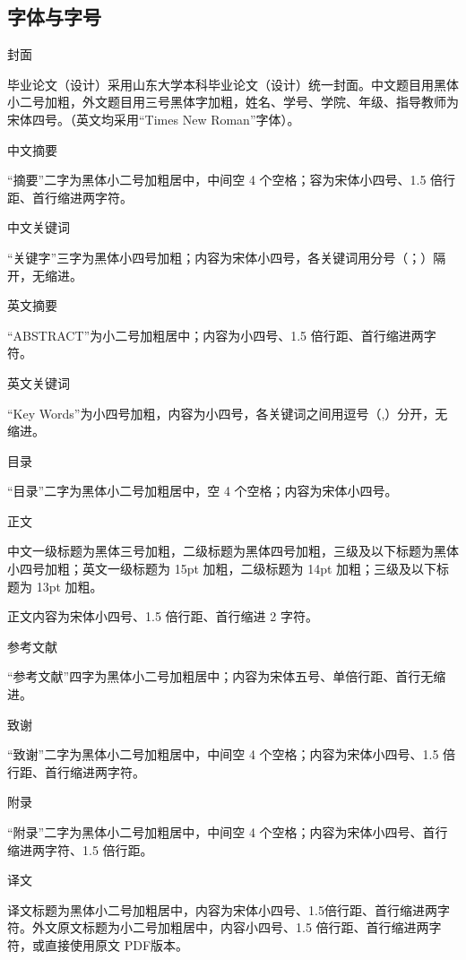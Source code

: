 \subsection{字体与字号}
\begin{compactenum}
\item 封面

毕业论文（设计）采用山东大学本科毕业论文（设计）统一封面。中文题目用黑体小二号加粗，外文题目用三号黑体字加粗，姓名、学号、学院、年级、指导教师为宋体四号。（英文均采用“Times New Roman”字体）。
\item 中文摘要

“摘要”二字为黑体小二号加粗居中，中间空 4 个空格；容为宋体小四号、1.5 倍行距、首行缩进两字符。
\item 中文关键词

“关键字”三字为黑体小四号加粗；内容为宋体小四号，各关键词用分号（；）隔开，无缩进。
\item 英文摘要

“ABSTRACT”为小二号加粗居中；内容为小四号、1.5 倍行距、首行缩进两字符。
\item 英文关键词

“Key Words”为小四号加粗，内容为小四号，各关键词之间用逗号（,）分开，无缩进。
\item 目录

“目录”二字为黑体小二号加粗居中，空 4 个空格；内容为宋体小四号。
\item 正文

中文一级标题为黑体三号加粗，二级标题为黑体四号加粗，三级及以下标题为黑体小四号加粗；英文一级标题为 15pt 加粗，二级标题为 14pt 加粗；三级及以下标题为 13pt 加粗。

正文内容为宋体小四号、1.5 倍行距、首行缩进 2 字符。
\item 参考文献

“参考文献”四字为黑体小二号加粗居中；内容为宋体五号、单倍行距、首行无缩进。
\item 致谢

“致谢”二字为黑体小二号加粗居中，中间空 4 个空格；内容为宋体小四号、1.5 倍行距、首行缩进两字符。
\item 附录

“附录”二字为黑体小二号加粗居中，中间空 4 个空格；内容为宋体小四号、首行缩进两字符、1.5 倍行距。
\item 译文

译文标题为黑体小二号加粗居中，内容为宋体小四号、1.5倍行距、首行缩进两字符。外文原文标题为小二号加粗居中，内容小四号、1.5 倍行距、首行缩进两字符，或直接使用原文 PDF版本。
\end{compactenum}
